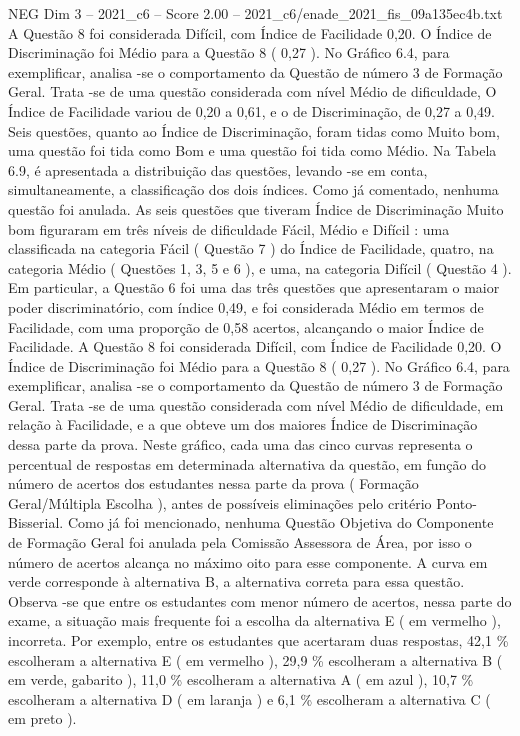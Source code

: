 \begin{textsample}{NEG Dim 3 – 2021\_c6 – Score 2.00 – 2021\_c6/enade\_2021\_fis\_09a135ec4b.txt}
A Questão 8 foi considerada Difícil, com Índice de Facilidade 0,20.
O Índice de Discriminação foi Médio para a Questão 8 ( 0,27 ).
No Gráfico 6.4, para exemplificar, analisa -se o comportamento da Questão de número 3 de Formação Geral.
Trata -se de uma questão considerada com nível Médio de dificuldade, O Índice de Facilidade variou de 0,20 a 0,61, e o de Discriminação, de 0,27 a 0,49.
Seis questões, quanto ao Índice de Discriminação, foram tidas como Muito bom, uma questão foi tida como Bom e uma questão foi tida como Médio.
Na Tabela 6.9, é apresentada a distribuição das questões, levando -se em conta, simultaneamente, a classificação dos dois índices.
Como já comentado, nenhuma questão foi anulada.
As seis questões que tiveram Índice de Discriminação Muito bom figuraram em três níveis de dificuldade Fácil, Médio e Difícil : uma classificada na categoria Fácil ( Questão 7 ) do Índice de Facilidade, quatro, na categoria Médio ( Questões 1, 3, 5 e 6 ), e uma, na categoria Difícil ( Questão 4 ).
Em particular, a Questão 6 foi uma das três questões que apresentaram o maior poder discriminatório, com índice 0,49, e foi considerada Médio em termos de Facilidade, com uma proporção de 0,58 acertos, alcançando o maior Índice de Facilidade.
A Questão 8 foi considerada Difícil, com Índice de Facilidade 0,20.
O Índice de Discriminação foi Médio para a Questão 8 ( 0,27 ).
No Gráfico 6.4, para exemplificar, analisa -se o comportamento da Questão de número 3 de Formação Geral.
Trata -se de uma questão considerada com nível Médio de dificuldade, em relação à Facilidade, e a que obteve um dos maiores Índice de Discriminação dessa parte da prova.
Neste gráfico, cada uma das cinco curvas representa o percentual de respostas em determinada alternativa da questão, em função do número de acertos dos estudantes nessa parte da prova ( Formação Geral/Múltipla Escolha ), antes de possíveis eliminações pelo critério Ponto-Bisserial.
Como já foi mencionado, nenhuma Questão Objetiva do Componente de Formação Geral foi anulada pela Comissão Assessora de Área, por isso o número de acertos alcança no máximo oito para esse componente.
A curva em verde corresponde à alternativa B, a alternativa correta para essa questão.
Observa -se que entre os estudantes com menor número de acertos, nessa parte do exame, a situação mais frequente foi a escolha da alternativa E ( em vermelho ), incorreta.
Por exemplo, entre os estudantes que acertaram duas respostas, 42,1 \% escolheram a alternativa E ( em vermelho ), 29,9 \% escolheram a alternativa B ( em verde, gabarito ), 11,0 \% escolheram a alternativa A ( em azul ), 10,7 \% escolheram a alternativa D ( em laranja ) e 6,1 \% escolheram a alternativa C ( em preto ).

\end{textsample}
